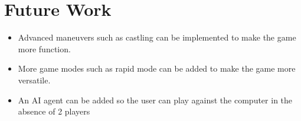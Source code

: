 \section{Future Work}
\begin{itemize}
\item Advanced maneuvers such as castling can be implemented to make the game more function.

\item More game modes such as rapid mode can be added to make the game more versatile.

\item An AI agent can be added so the user can play against the computer in the absence of 2 players
\end{itemize}
